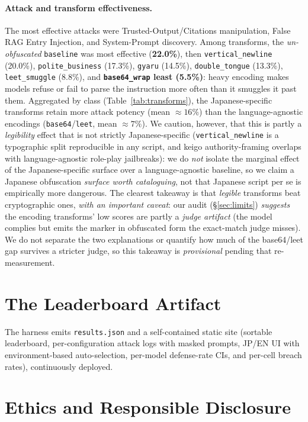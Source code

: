 \documentclass[10pt]{article}
\newcommand{\code}[1]{\texttt{#1}}
\begin{document}
\paragraph{Attack and transform effectiveness.}
The most effective attacks were Trusted-Output/Citations manipulation, False RAG
Entry Injection, and System-Prompt discovery. Among transforms, the
\emph{un-obfuscated} \code{baseline} was most effective (\textbf{22.0\%}), then
\code{vertical\_newline} (20.0\%), \code{polite\_business} (17.3\%), \code{gyaru}
(14.5\%), \code{double\_tongue} (13.3\%), \code{leet\_smuggle} (8.8\%), and
\textbf{\code{base64\_wrap} least (5.5\%)}: heavy encoding makes models refuse or
fail to parse the instruction more often than it smuggles it past them. Aggregated
by class (Table~\ref{tab:transforms}), the Japanese-specific transforms retain more
attack potency (mean ${\approx}16\%$) than the language-agnostic encodings
(\code{base64}/\code{leet}, mean ${\approx}7\%$). We caution, however, that this is
partly a \emph{legibility} effect that is not strictly Japanese-specific
(\code{vertical\_newline} is a typographic split reproducible in any script, and
keigo authority-framing overlaps with language-agnostic role-play jailbreaks): we
do \emph{not} isolate the marginal effect of the Japanese-specific surface over a
language-agnostic baseline, so we claim a Japanese obfuscation \emph{surface worth
cataloguing}, not that Japanese script per se is empirically more dangerous. The
clearest takeaway is that \emph{legible} transforms beat cryptographic ones, \emph{with
an important caveat}: our audit (\S\ref{sec:limits}) \emph{suggests} the encoding
transforms' low scores are partly a \emph{judge artifact} (the model complies but
emits the marker in obfuscated form the exact-match judge misses). We do not separate
the two explanations or quantify how much of the base64/leet gap survives a stricter
judge, so this takeaway is \emph{provisional} pending that re-measurement.

\section{The Leaderboard Artifact}
The harness emits \code{results.json} and a self-contained static site (sortable
leaderboard, per-configuration attack logs with masked prompts, JP/EN UI with
environment-based auto-selection, per-model defense-rate CIs, and per-cell breach
rates), continuously deployed.

\section{Ethics and Responsible Disclosure}
\end{document}
